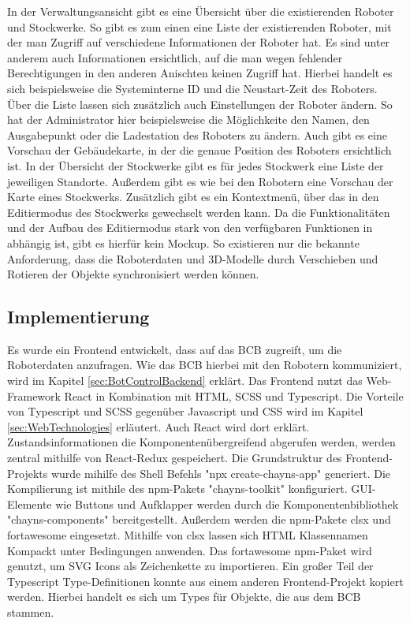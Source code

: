In der Verwaltungsansicht gibt es eine Übersicht über die existierenden Roboter und Stockwerke. So gibt es zum einen eine Liste der existierenden Roboter, mit der man Zugriff auf verschiedene Informationen der Roboter hat. Es sind unter anderem auch Informationen ersichtlich, auf die man wegen fehlender Berechtigungen in den anderen Anischten keinen Zugriff hat. Hierbei handelt es sich beispielsweise die Systeminterne \ac{ID} und die Neustart-Zeit des Roboters. Über die Liste lassen sich zusätzlich auch Einstellungen der Roboter ändern. So hat der Administrator hier beispielsweise die Möglichkeite den Namen, den Ausgabepunkt oder die Ladestation des Roboters zu ändern. Auch gibt es eine Vorschau der Gebäudekarte, in der die genaue Position des Roboters ersichtlich ist.
In der Übersicht der Stockwerke gibt es für jedes Stockwerk eine Liste der jeweiligen Standorte. Außerdem gibt es wie bei den Robotern eine Vorschau der Karte eines Stockwerks. Zusätzlich gibt es ein Kontextmenü, über das in den Editiermodus des Stockwerks gewechselt werden kann. Da die Funktionalitäten und der Aufbau des Editiermodus stark von den verfügbaren Funktionen in \deckgl{} abhängig ist, gibt es hierfür kein Mockup. So existieren nur die bekannte Anforderung, dass die Roboterdaten und 3D-Modelle durch Verschieben und Rotieren der Objekte synchronisiert werden können.

\subsection{Implementierung}
Es wurde ein Frontend entwickelt, dass auf das \ac{BCB} zugreift, um die Roboterdaten anzufragen. Wie das \ac{BCB} hierbei mit den Robotern kommuniziert, wird im Kapitel \ref{sec:BotControlBackend} erklärt. Das Frontend nutzt das Web-Framework React in Kombination mit \ac{HTML}, \ac{SCSS} und Typescript. Die Vorteile von Typescript und \ac{SCSS} gegenüber Javascript und \ac{CSS} wird im Kapitel \ref{sec:WebTechnologies} erläutert. Auch React wird dort erklärt. 
Zustandsinformationen die Komponentenübergreifend abgerufen werden, werden zentral mithilfe von React-Redux gespeichert. Die Grundstruktur des Frontend-Projekts wurde mihilfe des Shell Befehls "npx create-chayns-app" \cite{CreateChaynsApp} generiert. Die Kompilierung ist mithile des \ac{npm}-Pakets "chayns-toolkit" \cite{ChaynsToolkit} konfiguriert. \ac{GUI}-Elemente wie Buttons und Aufklapper werden durch die Komponentenbibliothek "chayns-components" \cite{ChaynsComponents} bereitgestellt. Außerdem werden die \ac{npm}-Pakete clsx \cite{clsx} und fortawesome \cite{fontawesome} eingesetzt. Mithilfe von clsx lassen sich HTML Klassennamen Kompackt unter Bedingungen anwenden. Das fortawesome \ac{npm}-Paket wird genutzt, um \ac{SVG} Icons als Zeichenkette zu importieren. Ein großer Teil der Typescript Type-Definitionen konnte aus einem anderen Frontend-Projekt kopiert werden. Hierbei handelt es sich um Types für Objekte, die aus dem \ac{BCB} stammen.


